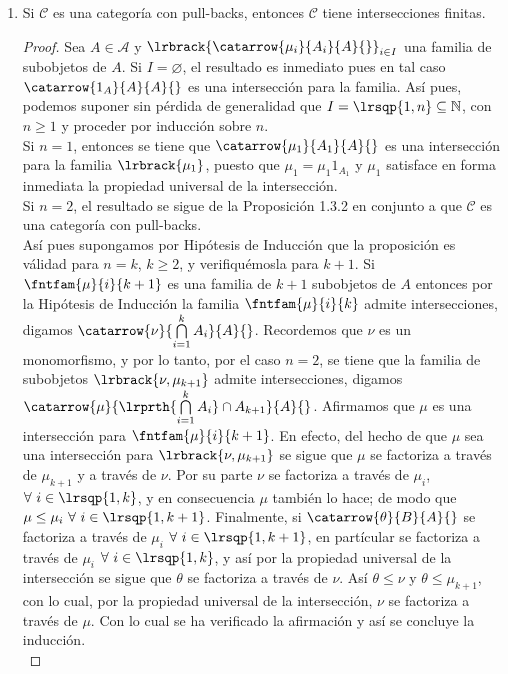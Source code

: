 \documentclass{article}
\begin{document}
\begin{enumerate}[label=\textbf{Ej \arabic*.}]
\begin{proof}
\centerline{}

Solo se usaron argumentos conjuntistas (no exclusivos de teoría de módulos) para esta prueba salvo el que intersección de módulos es módulo
 (intersección de conjuntos es conjunto) y que la inclusión conjuntista y la composición de morfismos es morfismo (composición de funciones es función),
por lo que este mismo resultado se demuestra de manera análoga para la categoría $Sets$.
\end{proof}


		\item Si $\mathscr{C}$ es una categoría con pull-backs, entonces $\mathscr{C}$ tiene intersecciones finitas.
		\begin{proof}
			Sea $A\in\mathscr{A}$ y $\lrbrack{\catarrow{\mu_i}{A_i}{A}{}}_{i\in I}$ una familia de subobjetos de $A$. Si $I=\varnothing$, el resultado es inmediato pues en tal caso $\catarrow{1_A}{A}{A}{}$ es una intersección para la familia. Así pues, podemos suponer sin pérdida de generalidad que $I=\lrsqp{1,n}\subseteq\mathbb{N}$, con $n\geq 1$ y proceder por inducción sobre $n$.\\
			Si $n=1$, entonces se tiene que $\catarrow{\mu_1}{A_1}{A}{}$ es una intersección para la familia $\lrbrack{\mu_1}$, puesto que 
			$\mu_1=\mu_1 1_{A_1}$ y $\mu_1$ satisface en forma inmediata la propiedad universal de la intersección.\\
			Si $n=2$, el resultado se sigue de la Proposición 1.3.2 en conjunto a que $\mathscr{C}$ es una categoría con pull-backs.\\
			Así pues supongamos por Hipótesis de Inducción que la proposición es válidad para $n=k$, $k\geq 2$, y verifiquémosla para $k+1$.
			Si $\fntfam{\mu}{i}{k+1}$ es una familia de $k+1$ subobjetos de $A$ entonces por la Hipótesis de Inducción la familia $\fntfam{\mu}{i}{k}$  admite intersecciones, digamos $\catarrow{\nu}{\bigcap\limits_{i=1}^{k}A_i}{A}{}$. Recordemos que $\nu$ es un monomorfismo, y por lo tanto, por el caso $n=2$, se tiene que la familia de subobjetos $\lrbrack{\nu,\mu_{k+1}}$ admite intersecciones, digamos $\catarrow{\mu}{\lrprth{\bigcap\limits_{i=1}^{k}A_i}\cap A_{k+1}}{A}{}$. Afirmamos que $\mu$ es una intersección para $\fntfam{\mu}{i}{k+1}$. En efecto, del hecho de que $\mu$ sea una intersección para $\lrbrack{\nu,\mu_{k+1}}$ se sigue que $\mu$ se factoriza a través de $\mu_{k+1}$ y a través de $\nu$. Por su parte $\nu$ se factoriza a través de $\mu_i$, $\forall\ i\in\lrsqp{1,k}$, y en consecuencia $\mu$ también lo hace; de modo que $\mu\leq\mu_i\ \forall\ i\in\lrsqp{1,k+1}$. Finalmente, si $\catarrow{\theta}{B}{A}{}$ se factoriza a través de $\mu_i$ $\forall\ i\in\lrsqp{1,k+1}$, en partícular se factoriza a través de $\mu_i$ $\forall\ i\in\lrsqp{1,k}$, y así por la propiedad universal de la intersección se sigue que $\theta$ se factoriza a través de $\nu$. Así $\theta\leq \nu$ y $\theta\leq \mu_{k+1}$, con lo cual, por la propiedad universal de la intersección, $\nu$ se factoriza a través de $\mu$. Con lo cual se ha verificado la afirmación y así se concluye la inducción.\\

\end{proof}
\end{enumerate}
\end{document}
